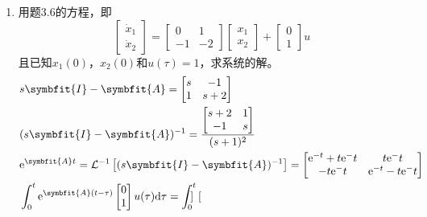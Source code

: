 \begin{exercise} %
    \begin{enumerate}
        \item 用题3.6的方程，即
        \begin{equation*}
            \begin{bmatrix}
                \dot{x}_1 \\
                \dot{x}_2
            \end{bmatrix} = \begin{bmatrix}
                0 & 1 \\
                -1 & -2 
            \end{bmatrix} \begin{bmatrix}
                x_1 \\
                x_2 
            \end{bmatrix} + \begin{bmatrix}
                0 \\
                1 
            \end{bmatrix} u
        \end{equation*}
        且已知$x_1(0)$，$x_2(0)$和$u(\tau) = 1$，求系统的解。
        \begin{align*}
            &s\symbfit{I} - \symbfit{A} = \begin{bmatrix}
                s & -1 \\
                1 & s+2
            \end{bmatrix} \\
            &(s\symbfit{I} - \symbfit{A})^{-1} = \frac{\begin{bmatrix}
                s+2 & 1 \\
                -1 & s
            \end{bmatrix}}{(s+1)^2} \\
            &{\rm e}^{\symbfit{A}t} = \mathcal{L}^{-1}\left[(s\symbfit{I} - \symbfit{A})^{-1}\right] = \begin{bmatrix}
                {\rm e}^{-t}+t{\rm e}^-t & t{\rm e}^-t \\
                -t{\rm e}^-t & {\rm e}^{-t}-t{\rm e}^-t
            \end{bmatrix} \\
            &\int_{0}^{t} {\rm e}^{\symbfit{A}(t-\tau)} \begin{bmatrix}
                0 \\
                1
            \end{bmatrix} u(\tau) {\rm d}\tau = \int_{0}^{t} \begin{bmatrix}

\end{bmatrix}
\end{align*}
\end{enumerate}
\end{exercise}
